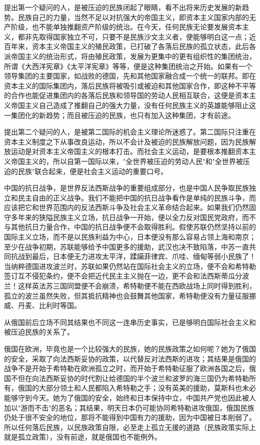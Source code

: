 \documentclass[
  openany,           %
  12pt,              %
  a4paper            %
]{ctexbook}
\begin{document}
提出第一个疑问的人，是被压迫的民族闭起了眼睛，看不出将来历史发展的新趋势。民族自己的力量，当然不足以对抗强大的帝国主义，即资本主义国家内部的无产阶级，也不能单独推翻资产阶级的统治。在今天，任何民族无论要发展资本主义，都非先取得国家独立不可，只要不是民族沙文主义者，便能够明白这一点；近百年来，资本主义帝国主义的殖民政策，已打破了各落后民族的孤立状态，此后各派帝国主义的统治形式，将由殖民政策，发展为更集中的更有组织性的集团统治，所谓《大西洋宪章》《太平洋宪章》等等，便是这种集团统治之开始。如果有一个领导集团的主要国家，如战败的德国，先和其他国家融合成一个统一的联邦。即在资本主义的国际集团内，落后民族将被吸引或被迫和其他国家合作，即这种不平等的合作也能促进集团内的各落后民族和领导国的劳动人民相互联合，这便是资本主义帝国主义自己造成了推翻自己的强大力量，没有任何民族主义的英雄能够阻止这一集团化的新趋势；而且被压迫的民族，也只有加入这种集团，才有前途。

提出第二个疑问的人，是被第二国际的机会主义理论所迷惑了。第二国际只注重在资本主义制度之下从事改良运动，所以不会计及被迫的民族解放问题，因为民族解放运动是对资本主义帝国主义的根本打击。而社会主义运动，是要根本推翻资本主义帝国主义的，所以自第一国际以来，"全世界被压迫的劳动人民"和"全世界被压迫的民族"联合起来，便是社会主义运动的重要口号。

中国的抗日战争，是世界反法西斯战争的重要组成部分，也是中国人民争取民族独立和民主自由的正义战争。我们不能把中国的抗日战争看作是单纯的民族斗争，而应该把它和世界范围内的反法西斯斗争及社会主义革命结合起来。如果我们仍然固守多年来的狭隘民族主义立场，抗日战争一开始，便以全力反对国民党政府，而不与其他抗日力量合作，中国的抗日战争便不会取得胜利。假使苏联仍然坚持以前的国际主义立场，而不是以民族利益为中心，日本便没有那么容易占领上海和南京；至少在战争初期，苏联能够给予中国更多的援助，武汉也决不致陷落，中苏一直共同抗战到最后，日本便无力进攻太平洋，蹂躏菲律宾、爪哇、缅甸等弱小民族了！当纳粹德国进攻波兰时，苏联如果仍然站在国际社会主义的立场，便不会和希特勒签订互不侵犯条约，便不会把近代民主主义抛在一边，更不会和法西斯蒂瓜分波兰！这样英法苏三国同盟便不会崩溃，希特勒便不能在西欧战场上同时得到胜利，孤立的波兰虽然失败，但其抵抗精神也会鼓舞其他国家，希特勒便没有力量征服挪威、丹麦、比利时等国。

从俄国前后立场不同其结果也不同这一连串历史事实，已是够明白国际社会主义和被压迫民族的关系了。

俄国在欧洲，毕竟也是一个比较强大的民族，她的民族政策之如何呢？她为了俄国的安全，采取了向法西斯妥协的政策，以代替反对法西斯的进攻；其结果是俄国的战争不是开始于希特勒在欧洲孤立之时，而开始于希特勒征服了欧洲各国之后，俄国不但在向法西斯妥协的时代割让给德国的半个波兰和波罗的海三国仍为希特勒所有，俄国的大部分领土和人民都陷入希特勒之手；没有英美的援助，莫斯科也未必能够守到今天。她为了俄国的安全，始终和日本保持中立，中国共产党也因此被人加以"游而不击"的恶名；其结果，明天日本仍可能协同希特勒进攻俄国，俄国民族仍处于很不安全的地位，那将不能得到中国有力的援助，因为中国被日本削弱了。所以任何落后民族，以民族政策自限，必至走上孤立无援的道路（民族政策实际上就是孤立政策），没有前途，就是俄国也不能例外。
\end{document}

